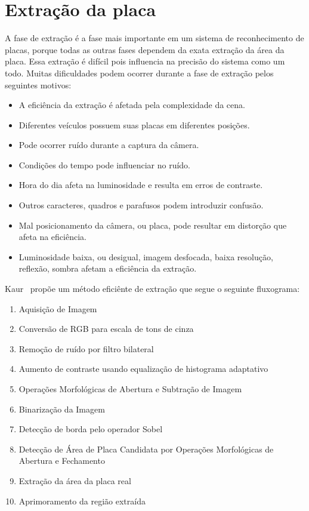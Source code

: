 \section{Extração da placa}
\label{sec:extracao}

A fase de extração é a fase mais importante em um sistema de reconhecimento de
placas, porque todas as outras fases dependem da exata extração da área da
placa. Essa extração é difícil pois influencia na precisão do sistema como um
todo. Muitas dificuldades podem ocorrer durante a fase de extração pelos
seguintes motivos:

\begin{itemize}
	\item A eficiência da extração é afetada pela complexidade da cena.
	\item Diferentes veículos possuem suas placas em diferentes posições.
	\item Pode ocorrer ruído durante a captura da câmera.
	\item Condições do tempo pode influenciar no ruído.
	\item Hora do dia afeta na luminosidade e resulta em erros de contraste.
	\item Outros caracteres, quadros e parafusos podem introduzir confusão.
	\item Mal posicionamento da câmera, ou placa, pode resultar em distorção que afeta na eficiência.
	\item Luminosidade baixa, ou desigual, imagem desfocada, baixa resolução, reflexão, sombra afetam a eficiência da extração.
\end{itemize}

Kaur~\cite{kaur2014efficient} propõe um método eficiênte de
extração que segue o seguinte fluxograma:

\begin{enumerate}
	\item Aquisição de Imagem
	\item Conversão de RGB para escala de tons de cinza
	\item Remoção de ruído por filtro bilateral
	\item Aumento de contraste usando equalização de histograma adaptativo
	\item Operações Morfológicas de Abertura e Subtração de Imagem
	\item Binarização da Imagem
	\item Detecção de borda pelo operador Sobel
	\item Detecção de Área de Placa Candidata por Operações Morfológicas de Abertura e Fechamento
	\item Extração da área da placa real
	\item Aprimoramento da região extraída
\end{enumerate}


